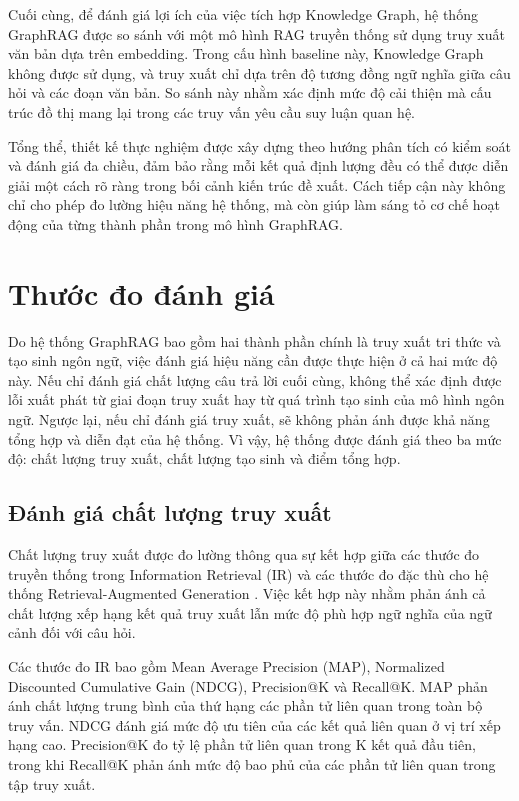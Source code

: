 Cuối cùng, để đánh giá lợi ích của việc tích hợp Knowledge Graph, hệ thống GraphRAG được so sánh với một mô hình RAG truyền thống sử dụng truy xuất văn bản dựa trên embedding. Trong cấu hình baseline này, Knowledge Graph không được sử dụng, và truy xuất chỉ dựa trên độ tương đồng ngữ nghĩa giữa câu hỏi và các đoạn văn bản. So sánh này nhằm xác định mức độ cải thiện mà cấu trúc đồ thị mang lại trong các truy vấn yêu cầu suy luận quan hệ.

Tổng thể, thiết kế thực nghiệm được xây dựng theo hướng phân tích có kiểm soát và đánh giá đa chiều, đảm bảo rằng mỗi kết quả định lượng đều có thể được diễn giải một cách rõ ràng trong bối cảnh kiến trúc đề xuất. Cách tiếp cận này không chỉ cho phép đo lường hiệu năng hệ thống, mà còn giúp làm sáng tỏ cơ chế hoạt động của từng thành phần trong mô hình GraphRAG.

\section{Thước đo đánh giá}

Do hệ thống GraphRAG bao gồm hai thành phần chính là truy xuất tri thức và tạo sinh ngôn ngữ, việc đánh giá hiệu năng cần được thực hiện ở cả hai mức độ này. Nếu chỉ đánh giá chất lượng câu trả lời cuối cùng, không thể xác định được lỗi xuất phát từ giai đoạn truy xuất hay từ quá trình tạo sinh của mô hình ngôn ngữ. Ngược lại, nếu chỉ đánh giá truy xuất, sẽ không phản ánh được khả năng tổng hợp và diễn đạt của hệ thống. Vì vậy, hệ thống được đánh giá theo ba mức độ: chất lượng truy xuất, chất lượng tạo sinh và điểm tổng hợp.

\subsection{Đánh giá chất lượng truy xuất}

Chất lượng truy xuất được đo lường thông qua sự kết hợp giữa các thước đo truyền thống trong Information Retrieval (IR) và các thước đo đặc thù cho hệ thống Retrieval-Augmented Generation . Việc kết hợp này nhằm phản ánh cả chất lượng xếp hạng kết quả truy xuất lẫn mức độ phù hợp ngữ nghĩa của ngữ cảnh đối với câu hỏi.

Các thước đo IR bao gồm Mean Average Precision (MAP), Normalized Discounted Cumulative Gain (NDCG), Precision@K và Recall@K. MAP \cite{manning2008ir} phản ánh chất lượng trung bình của thứ hạng các phần tử liên quan trong toàn bộ truy vấn. NDCG \cite{jarvelin2002ndcg} đánh giá mức độ ưu tiên của các kết quả liên quan ở vị trí xếp hạng cao. Precision@K đo tỷ lệ phần tử liên quan trong K kết quả đầu tiên, trong khi Recall@K phản ánh mức độ bao phủ của các phần tử liên quan trong tập truy xuất.

